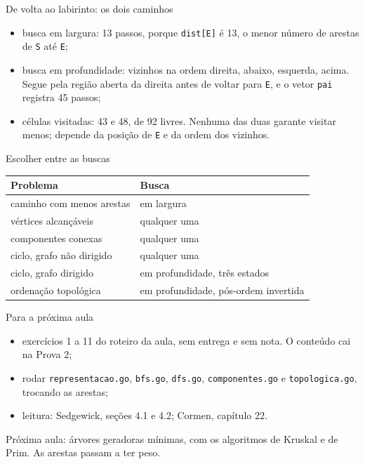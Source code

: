 \documentclass{beamer}
\begin{document}
\begin{frame}{De volta ao labirinto: os dois caminhos}
	\begin{itemize}
		\item busca em largura: 13 passos, porque \texttt{dist[E]} é 13, o menor
		      número de arestas de \texttt{S} até \texttt{E};
		\item busca em profundidade: vizinhos na ordem direita, abaixo,
		      esquerda, acima. Segue pela região aberta da direita antes de voltar
		      para \texttt{E}, e o vetor \texttt{pai} registra 45 passos;
		\item células visitadas: 43 e 48, de 92 livres. Nenhuma das duas
		      garante visitar menos; depende da posição de \texttt{E} e da ordem
		      dos vizinhos.
	\end{itemize}
\end{frame}

\begin{frame}{Escolher entre as buscas}
	\begin{center}
		\begin{tabular}{ll}
			\toprule
			Problema & Busca \\
			\midrule
			caminho com menos arestas & em largura \\
			vértices alcançáveis & qualquer uma \\
			componentes conexas & qualquer uma \\
			ciclo, grafo não dirigido & qualquer uma \\
			ciclo, grafo dirigido & em profundidade, três estados \\
			ordenação topológica & em profundidade, pós-ordem invertida \\
			\bottomrule
		\end{tabular}
	\end{center}
\end{frame}

\begin{frame}{Para a próxima aula}
	\begin{itemize}
		\item exercícios 1 a 11 do roteiro da aula, sem entrega e sem nota. O
		      conteúdo cai na Prova 2;
		\item rodar \texttt{representacao.go}, \texttt{bfs.go}, \texttt{dfs.go},
		      \texttt{componentes.go} e \texttt{topologica.go}, trocando as
		      arestas;
		\item leitura: Sedgewick, seções 4.1 e 4.2; Cormen, capítulo 22.
	\end{itemize}

	\vspace{0.5cm}
	Próxima aula: árvores geradoras mínimas, com os algoritmos de Kruskal e de
	Prim. As arestas passam a ter peso.
\end{frame}
\end{document}
